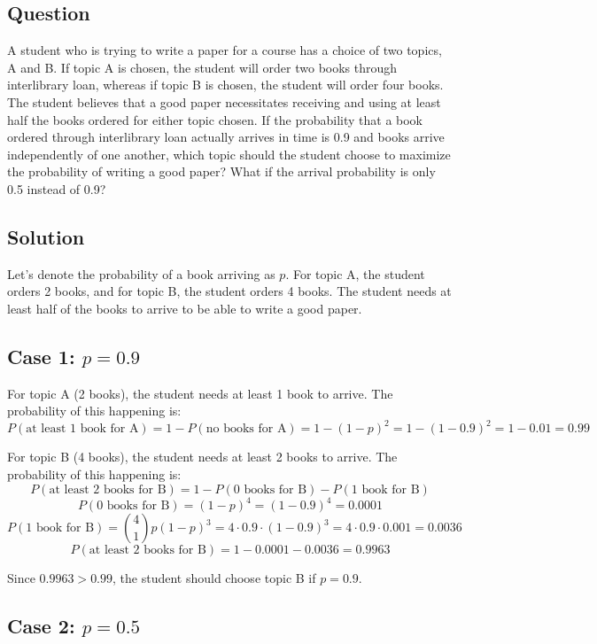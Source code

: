 \documentclass{article}
\begin{document}
\subsection*{Question}
A student who is trying to write a paper for a course has a choice of two topics, A and B. If topic A is chosen, the student will order two books through interlibrary loan, whereas if topic B is chosen, the student will order four books. The student believes that a good paper necessitates receiving and using at least half the books ordered for either topic chosen. If the probability that a book ordered through interlibrary loan actually arrives in time is 0.9 and books arrive independently of one another, which topic should the student choose to maximize the probability of writing a good paper? What if the arrival probability is only 0.5 instead of 0.9?

\subsection*{Solution}
Let's denote the probability of a book arriving as \( p \). For topic A, the student orders 2 books, and for topic B, the student orders 4 books. The student needs at least half of the books to arrive to be able to write a good paper.

\subsection*{Case 1: \( p = 0.9 \)}

For topic A (2 books), the student needs at least 1 book to arrive. The probability of this happening is:
\[
P(\text{at least 1 book for A}) = 1 - P(\text{no books for A}) = 1 - (1-p)^2 = 1 - (1-0.9)^2 = 1 - 0.01 = 0.99
\]

For topic B (4 books), the student needs at least 2 books to arrive. The probability of this happening is:
\[
P(\text{at least 2 books for B}) = 1 - P(\text{0 books for B}) - P(\text{1 book for B})
\]
\[
P(\text{0 books for B}) = (1-p)^4 = (1-0.9)^4 = 0.0001
\]
\[
P(\text{1 book for B}) = \binom{4}{1} p (1-p)^3 = 4 \cdot 0.9 \cdot (1-0.9)^3 = 4 \cdot 0.9 \cdot 0.001 = 0.0036
\]
\[
P(\text{at least 2 books for B}) = 1 - 0.0001 - 0.0036 = 0.9963
\]

Since \(0.9963 > 0.99\), the student should choose topic B if \(p = 0.9\).

\subsection*{Case 2: \( p = 0.5 \)}
\end{document}
